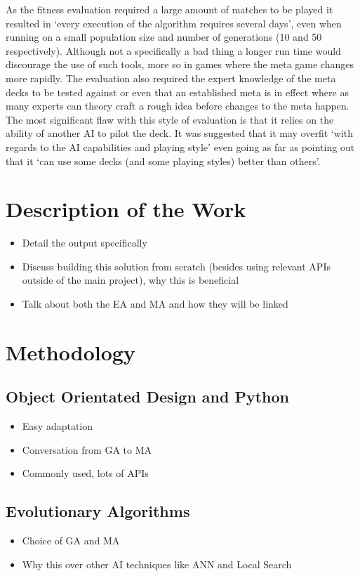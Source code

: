 \documentclass[a4paper]{article}
\begin{document}
As the fitness evaluation required a large amount of matches to be played it resulted in `every execution of the algorithm requires several days', even when running on a small population size and number of generations (10 and 50 respectively).
Although not a specifically a bad thing a longer run time would discourage the use of such tools, more so in games where the meta game changes more rapidly.
The evaluation also required the expert knowledge of the meta decks to be tested against or even that an established meta is in effect where as many experts can theory craft a rough idea before changes to the meta happen.
The most significant flaw with this style of evaluation is that it relies on the ability of another AI to pilot the deck.
It was suggested that it may overfit `with regards to the AI capabilities and playing style' even going as far as pointing out that it `can use some decks (and some playing styles) better than others'.

\section{Description of the Work}
\begin{itemize}
    \item Detail the output specifically
    \item Discuss building this solution from scratch (besides using relevant APIs outside of the main project), why this is beneficial
    \item Talk about both the EA and MA and how they will be linked
\end{itemize}

\section{Methodology}
\subsection{Object Orientated Design and Python}
\begin{itemize}
    \item Easy adaptation
    \item Conversation from GA to MA
    \item Commonly used, lots of APIs
\end{itemize}
\subsection{Evolutionary Algorithms}
\begin{itemize}
    \item Choice of GA and MA
    \item Why this over other AI techniques like ANN and Local Search
\end{itemize}
\end{document}
